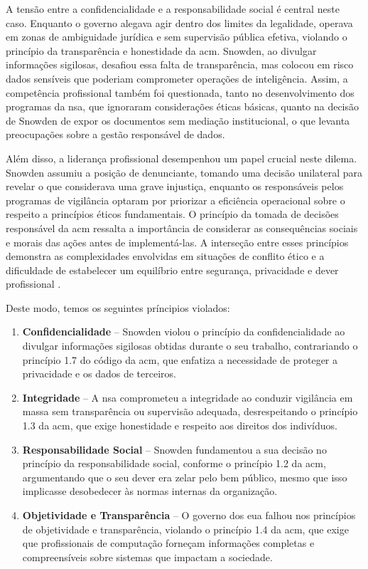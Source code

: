 \documentclass[a4paper,12pt]{article}
\begin{document}
A tensão entre a confidencialidade e a responsabilidade social é central neste caso. Enquanto o governo alegava agir dentro dos limites da legalidade, operava em zonas de ambiguidade jurídica e sem supervisão pública efetiva, violando o princípio da transparência e honestidade da \acrshort{acm}. Snowden, ao divulgar informações sigilosas, desafiou essa falta de transparência, mas colocou em risco dados sensíveis que poderiam comprometer operações de inteligência. Assim, a competência profissional também foi questionada, tanto no desenvolvimento dos programas da \acrshort{nsa}, que ignoraram considerações éticas básicas, quanto na decisão de Snowden de expor os documentos sem mediação institucional, o que levanta preocupações sobre a gestão responsável de dados.

Além disso, a liderança profissional desempenhou um papel crucial neste dilema. Snowden assumiu a posição de denunciante, tomando uma decisão unilateral para revelar o que considerava uma grave injustiça, enquanto os responsáveis pelos programas de vigilância optaram por priorizar a eficiência operacional sobre o respeito a princípios éticos fundamentais. O princípio da tomada de decisões responsável da \acrshort{acm} ressalta a importância de considerar as consequências sociais e morais das ações antes de implementá-las. A interseção entre esses princípios demonstra as complexidades envolvidas em situações de conflito ético e a dificuldade de estabelecer um equilíbrio entre segurança, privacidade e dever profissional \cite{scheuerman}.

Deste modo, temos os seguintes príncipios violados:
\begin{enumerate}
    \item \textbf{Confidencialidade} – Snowden violou o princípio da confidencialidade ao divulgar informações sigilosas obtidas durante o seu trabalho, contrariando o princípio 1.7 do código da \acrshort{acm}, que enfatiza a necessidade de proteger a privacidade e os dados de terceiros.
    
    \item \textbf{Integridade} – A \acrshort{nsa} comprometeu a integridade ao conduzir vigilância em massa sem transparência ou supervisão adequada, desrespeitando o princípio 1.3 da \acrshort{acm}, que exige honestidade e respeito aos direitos dos indivíduos.
    
    \item \textbf{Responsabilidade Social} – Snowden fundamentou a sua decisão no princípio da responsabilidade social, conforme o princípio 1.2 da \acrshort{acm}, argumentando que o seu dever era zelar pelo bem público, mesmo que isso implicasse desobedecer às normas internas da organização.
    
    \item \textbf{Objetividade e Transparência} – O governo dos \acrshort{eua} falhou nos princípios de objetividade e transparência, violando o princípio 1.4 da \acrshort{acm}, que exige que profissionais de computação forneçam informações completas e compreensíveis sobre sistemas que impactam a sociedade. \cite{association}
\end{enumerate}
\end{document}
